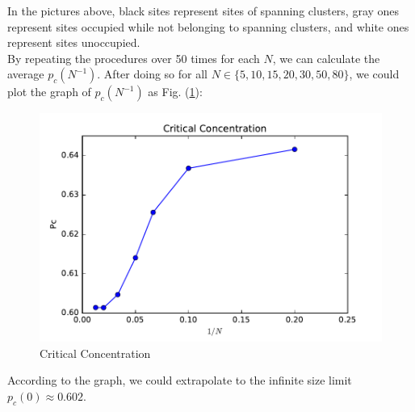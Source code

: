 \documentclass[12pt]{article}
\begin{document}
In the pictures above, black sites represent sites of spanning clusters, gray ones represent sites occupied while not belonging to spanning clusters, and white ones represent sites unoccupied.\\
\indent By repeating the procedures over 50 times for each $N$, we can calculate the average $p_c(N^{-1})$. After doing so for all $N\in\{5, 10, 15, 20, 30, 50, 80\}$, we could plot the graph of $p_c(N^{-1})$ as Fig. (\ref{Critical}):
\begin{figure}[H]
\includegraphics{Critical.pdf}
\caption{Critical Concentration}
\label{Critical}
\end{figure}
According to the graph, we could extrapolate to the infinite size limit $p_c(0)\approx0.602$.
\end{document}
